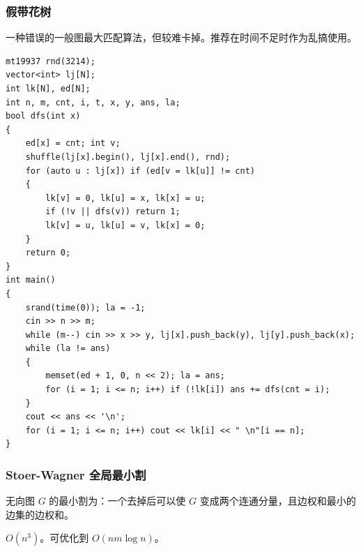 \documentclass[12pt]{ctexart}
\begin{document}
\subsubsection{假带花树}

一种错误的一般图最大匹配算法，但较难卡掉。推荐在时间不足时作为乱搞使用。

\begin{lstlisting}
mt19937 rnd(3214);
vector<int> lj[N];
int lk[N], ed[N];
int n, m, cnt, i, t, x, y, ans, la;
bool dfs(int x)
{
	ed[x] = cnt; int v;
	shuffle(lj[x].begin(), lj[x].end(), rnd);
	for (auto u : lj[x]) if (ed[v = lk[u]] != cnt)
	{
		lk[v] = 0, lk[u] = x, lk[x] = u;
		if (!v || dfs(v)) return 1;
		lk[v] = u, lk[u] = v, lk[x] = 0;
	}
	return 0;
}
int main()
{
	srand(time(0)); la = -1;
	cin >> n >> m;
	while (m--) cin >> x >> y, lj[x].push_back(y), lj[y].push_back(x);
	while (la != ans)
	{
		memset(ed + 1, 0, n << 2); la = ans;
		for (i = 1; i <= n; i++) if (!lk[i]) ans += dfs(cnt = i);
	}
	cout << ans << '\n';
	for (i = 1; i <= n; i++) cout << lk[i] << " \n"[i == n];
}

\end{lstlisting}

\subsubsection{Stoer-Wagner 全局最小割}

无向图 $G$ 的最小割为：一个去掉后可以使 $G$ 变成两个连通分量，且边权和最小的边集的边权和。

$O(n^3)$。可优化到 $O(nm\log n)$。
\end{document}
